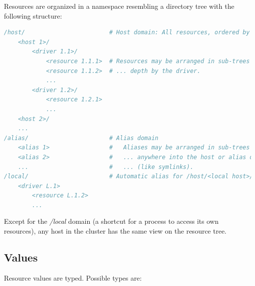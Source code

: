 \documentclass[12pt,english,parskip=half,headheight=19pt]{scrreprt}
\begin{document}
Resources are organized in a namespace resembling a directory tree with
the following structure:
\begin{lstlisting}[language=comments]
/host/                        # Host domain: All resources, ordered by host/driver
    <host 1>/
        <driver 1.1>/
            <resource 1.1.1>  # Resources may be arranged in sub-trees of arbitrary ...
            <resource 1.1.2>  # ... depth by the driver.
            ...
        <driver 1.2>/
            <resource 1.2.1>
            ...
    <host 2>/
    ...
/alias/                       # Alias domain
    <alias 1>                 #   Aliases may be arranged in sub-trees and may point ...
    <alias 2>                 #   ... anywhere into the host or alias domain ...
    ...                       #   ... (like symlinks).
/local/                       # Automatic alias for /host/<local host>/...
    <driver L.1>
        <resource L.1.2>
        ...
\end{lstlisting}

Except for the \textit{/local} domain (a shortcut for a process to
access its own resources), any host in the cluster has the same view on
the resource tree.



\subsection{Values}
\label{sec:resources-resources-values}

Resource values are typed. Possible types are:
\end{document}
